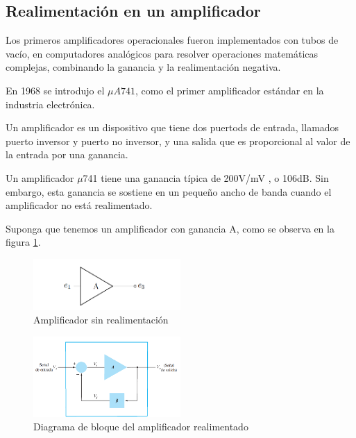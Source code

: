 \subsection{Realimentación en un amplificador}

Los primeros amplificadores operacionales fueron implementados con tubos de vacío, en computadores analógicos para resolver operaciones matemáticas complejas, combinando la ganancia y la realimentación negativa.

En 1968 se introdujo el $\mu A741$, como el primer amplificador estándar en la industria electrónica.

Un amplificador es un dispositivo que tiene dos puertods de entrada, llamados puerto inversor y puerto no inversor, y una salida que es proporcional
al valor de la entrada por una ganancia.

Un amplificador $\mu$741 tiene una ganancia típica de 200V/mV , o 106dB. Sin embargo, esta ganancia se sostiene en un pequeño ancho de banda cuando el amplificador no está realimentado.

Suponga que tenemos un amplificador con ganancia A, como se observa
en la figura \ref{fig:mt-amplificador-sin-realimentar}.

\begin{figure}[ht]
    \centering
    \includegraphics[width=0.5\textwidth]{src/images/amplificador-sin-realimentar.png}
    \caption{Amplificador sin realimentación}
    \label{fig:mt-amplificador-sin-realimentar}
\end{figure}

\begin{figure}[ht]
    \centering
    \includegraphics[width=0.5\textwidth]{src/images/amplificador-realimentado.png}
    \caption{Diagrama de bloque del amplificador realimentado}
    \label{fig:mt-amplificador-realimentado}
\end{figure}

